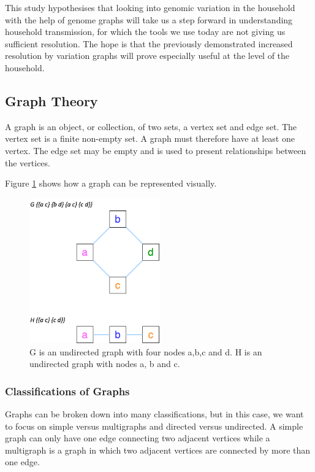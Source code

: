 \documentclass[10pt, a4paper]{article}
\begin{document}
This study hypothesises that looking into genomic variation in the household
with the help of genome graphs will take us a step forward in understanding
household transmission, for which the tools we use today are not giving us
sufficient resolution.
The hope is that the previously demonstrated increased resolution by variation
graphs \cite{garrisonVariationGraphToolkit2018} will prove especially useful at
the level of the household.


\clearpage

\subsection{Graph Theory}
\label{sec:org22a28ba}
A graph is an object, or collection, of two sets, a vertex set and edge set.
The vertex set is a finite non-empty set. A graph must therefore have at least
one vertex.
The edge set may be empty \cite{trudeauIntroductionGraphTheory1993}
and is used to present relationships between the vertices.

Figure \ref{fig:org5388111} shows how a graph can be represented
visually.


\begin{figure}[!ht]
\centering
\includegraphics[width=0.5\textwidth]{../Figures/Three-and-four-node-graph.png}
\caption[A Three Node and A Four Node Graph]{\label{fig:org5388111}G is an undirected graph with four nodes a,b,c and d. H is an undirected graph with nodes a, b and c.}
\end{figure}

\subsubsection{Classifications of Graphs}
\label{sec:orgbfa6c20}
Graphs can be broken down into many classifications, but in this case, we want
to focus on simple versus multigraphs and directed versus undirected.
A simple graph can only have one edge connecting two adjacent vertices while a
multigraph is a graph in which two adjacent vertices are connected by more than
one edge.
\end{document}
